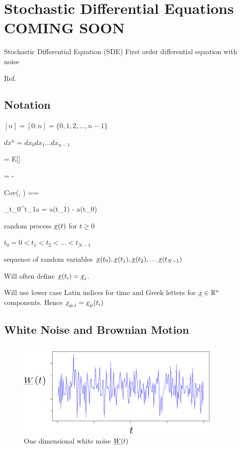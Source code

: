 \chapter{Stochastic Differential Equations COMING SOON}
\label{ch-stochastic-diff-eqns}

Stochastic Differential Equation (SDE)
First order differential equation with noise

Ref.\cite{sde-applied-book}

\section{Notation}

$[n]=[0:n]=\{0, 1, 2, \ldots, n-1\}$

$dx^n = dx_0 dx_1 \ldots dx_{n-1}$

\beq 
\av{\rva} = E[\rva]
\eeq

\beq
\Delta \rva = \rva - \av{\rva}
\eeq

\beq
Cov(\rva, \rvb) =\av{\rva, \rvb}=
\av{\Delta\rva \Delta\rvb}
\eeq

\beq
\Delta_{t_0}^{t_1}a = a(t_1) - a(t_0)
\eeq



random process ${\underline{x}}(t)$ for $t\geq 0$

$t_0=0 < t_1 < t_2 <\ldots< t_{N-1}$

sequence of random variables ${\underline{x}}(t_0),
 {\underline{x}}(t_1), {\underline{x}}(t_2), \ldots {\underline{x}}(t_{N-1})$
 
Will often define ${\underline{x}}(t_i) ={\underline{x}}_i$.

Will use lower case Latin indices for time
and Greek letters for ${\underline{x}}\in{ \mathbb{R}}^n$ components.
Hence ${\underline{x}}_{\mu, i}={\underline{x}}_\mu(t_i)$



 
 \section{White Noise and Brownian Motion}
 
 \begin{figure}[h!]
 \centering
 \includegraphics[width=4in]
 {stochastic-diff-eqns/white-noise-labeled}
 \caption{One dimensional white noise ${\underline{W}}(t)$}
 \label{fig-white-noise-t}
 \end{figure}
 
